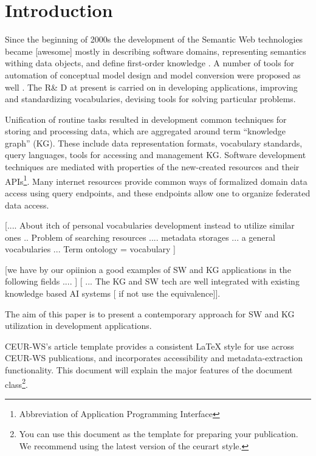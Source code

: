 \documentclass[
]{ceurart}
\begin{document}
\maketitle

\section{Introduction}

Since the beginning of 2000s the development of the Semantic Web technologies became [awesome] mostly in describing software domains, representing semantics withing data objects, and define first-order knowledge \cite{}.  A number of tools for automation of conceptual model design and model conversion were proposed as well \cite{}.  The R\& D at present is carried on in developing applications, improving and standardizing vocabularies, devising tools for solving particular problems.

Unification of routine tasks resulted in development common techniques for storing and processing data, which are aggregated around term ``knowledge graph'' (KG).  These include data representation formats, vocabulary standards, query languages, tools for accessing and management KG.  Software development techniques are mediated with properties of the new-created resources and their APIs\footnote{Abbreviation of Application Programming Interface}.  Many internet resources provide common ways of formalized domain data access using query endpoints, and these endpoints allow one to organize federated data access.

[.... About itch of personal vocabularies development instead to utilize similar ones .. Problem of searching resources ....  metadata storages ... a general vocabularies ... Term ontology = vocabulary ]


[we have by our opiinion a good examples of SW and KG applications in the following fields .... ]  [ ... The KG and SW tech are well integrated with existing knowledge based AI systems [ if not use the equivalence]].

The aim of this paper is to present a contemporary approach for SW and KG utilization in development applications.


CEUR-WS's article template provides a consistent \LaTeX{} style for
use across CEUR-WS publications, and incorporates accessibility and
metadata-extraction functionality. This document will explain the
major features of the document class\footnote{You can use this
  document as the template for preparing your publication. We
  recommend using the latest version of the ceurart style.}.
\end{document}
